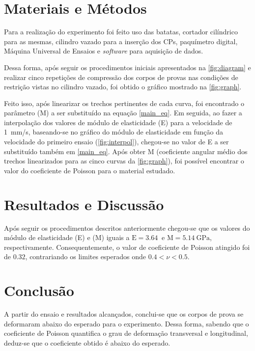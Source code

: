 \documentclass[a4paper, 12pt, brazilian]{article}
\begin{document}
	\section{Materiais e Métodos}
	
	Para a realização do experimento foi feito uso das batatas, cortador cilíndrico para as mesmas, cilindro vazado para a inserção dos CPs, paquímetro digital, Máquina Universal de Ensaios e \textit{software} para aquisição de dados. 
	
	Dessa forma, após seguir os procedimentos iniciais apresentados na  \cref{fig:diagram} e realizar cinco repetições de compressão dos corpos de provas nas condições de restrição vistas no cilindro vazado, foi obtido o gráfico mostrado na \cref{fig:graph}.
	
	Feito isso, após linearizar os trechos pertinentes de cada curva, foi encontrado o parâmetro (M) a ser substituído na equação \eqref{main_eq}. Em seguida, ao fazer a interpolação dos valores de módulo de elasticidade (E) para a velocidade de
	\SI{1}{\milli\meter/\second}, baseando-se no gráfico do módulo de elasticidade em função da velocidade do primeiro ensaio (\cref{fig:interpol}), chegou-se no valor de E a ser substituído também em \eqref{main_eq}. Após obter M (coeficiente angular médio dos trechos linearizados para as cinco curvas da \cref{fig:graph}), foi possível encontrar o valor do coeficiente de Poisson para o material estudado.
	
	\section{Resultados e Discussão}
	
	Após seguir os procedimentos descritos anteriormente chegou-se que os valores do módulo de elasticidade (E) e (M) iguais a $\textrm{E}=\SI{3.64}{}$ e $\textrm{M}=\SI{5.14}{\giga\pascal}$, respectivamente. Consequentemente, o valor de coeficiente de Poisson atingido foi de $0.32$, contrariando os limites esperados onde $0.4<\nu<0.5$.
	
	\section{Conclusão}

	A partir do ensaio e resultados alcançados, conclui-se que os corpos de prova se deformaram abaixo do esperado para o experimento. Dessa forma, sabendo que o coeficiente de Poisson quantifica o grau de deformação transversal e longitudinal, deduz-se que o coeficiente obtido é abaixo do esperado.
	
\end{document}
